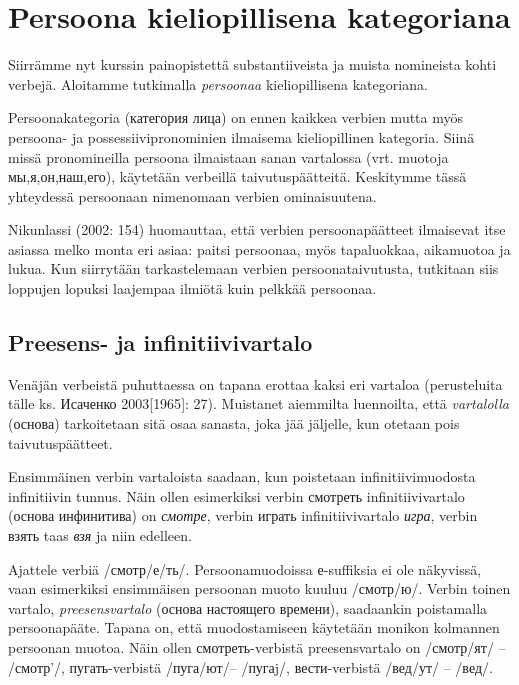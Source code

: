 \documentclass[]{scrreprt}
\begin{document}
\chapter{Persoona kieliopillisena
kategoriana}\label{luento-11-persoona-kieliopillisena-kategoriana}


Siirrämme nyt kurssin painopistettä substantiiveista ja muista
nomineista kohti verbejä. Aloitamme tutkimalla \emph{persoonaa}
kieliopillisena kategoriana.

Persoonakategoria (категория лица) on ennen kaikkea verbien mutta myös
persoona- ja possessiivipronominien ilmaisema kieliopillinen kategoria.
Siinä missä pronomineilla persoona ilmaistaan sanan vartalossa (vrt.
muotoja мы,я,он,наш,его), käytetään verbeillä taivutuspäätteitä.
Keskitymme tässä yhteydessä persoonaan nimenomaan verbien ominaisuutena.

Nikunlassi (2002: 154) huomauttaa, että verbien persoonapäätteet
ilmaisevat itse asiassa melko monta eri asiaa: paitsi persoonaa, myös
tapaluokkaa, aikamuotoa ja lukua. Kun siirrytään tarkastelemaan verbien
persoonataivutusta, tutkitaan siis loppujen lopuksi laajempaa ilmiötä
kuin pelkkää persoonaa.

\section{Preesens- ja
infinitiivivartalo}\label{preesens--ja-infinitiivivartalo}

Venäjän verbeistä puhuttaessa on tapana erottaa kaksi eri vartaloa
(perusteluita tälle ks. Исаченко 2003{[}1965{]}: 27). Muistanet
aiemmilta luennoilta, että \emph{vartalolla} (основа) tarkoitetaan sitä
osaa sanasta, joka jää jäljelle, kun otetaan pois taivutuspäätteet.

Ensimmäinen verbin vartaloista saadaan, kun poistetaan
infinitiivimuodosta infinitiivin tunnus. Näin ollen esimerkiksi verbin
смотреть infinitiivivartalo (основа инфинитива) on \emph{смотре}, verbin
играть infinitiivivartalo \emph{игра}, verbin взять taas \emph{взя} ja
niin edelleen.

Ajattele verbiä /смотр/е/ть/. Persoonamuodoissa е-suffiksia ei ole
näkyvissä, vaan esimerkiksi ensimmäisen persoonan muoto kuuluu
/смотр/ю/. Verbin toinen vartalo, \emph{preesensvartalo} (основа
настоящего времени), saadaankin poistamalla persoonapääte. Tapana on,
että muodostamiseen käytetään monikon kolmannen persoonan muotoa. Näin
ollen смотреть-verbistä preesensvartalo on /смотр/ят/ -- /смотр'/,
пугать-verbistä /пуга/ют/-- /пугаj/, вести-verbistä /вед/ут/ -- /вед/.
\end{document}

